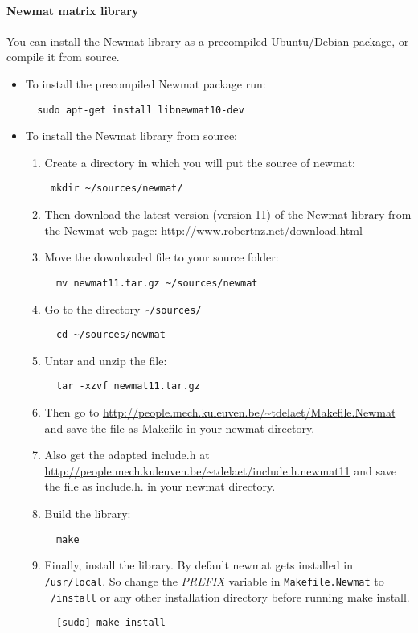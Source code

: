 \documentclass[a4paper,10pt]{article}
\begin{document}
\paragraph{Newmat matrix library}
You can install the Newmat library as a precompiled Ubuntu/Debian
package, or compile it from source.
\begin{itemize}
\item To install the precompiled Newmat package run:
\begin{verbatim}
  sudo apt-get install libnewmat10-dev
\end{verbatim}


\item To install the Newmat library from source:
\begin{enumerate}
\item Create a directory in which you will put the source of newmat:
\begin{verbatim}
 mkdir ~/sources/newmat/
\end{verbatim}
\item Then download the latest version (version 11) of the Newmat library from the
  Newmat web page:
  \url{http://www.robertnz.net/download.html}
\item Move the downloaded file to your source folder:
\begin{verbatim}
  mv newmat11.tar.gz ~/sources/newmat
\end{verbatim}
\item Go to the directory \ $\mathtt{\tilde{ }}$\texttt{/sources/}
\begin{verbatim}
  cd ~/sources/newmat
\end{verbatim}
\item Untar and unzip the file:
\begin{verbatim}
  tar -xzvf newmat11.tar.gz
\end{verbatim}
\item Then go to \url{http://people.mech.kuleuven.be/~tdelaet/Makefile.Newmat} and save the file as Makefile in your newmat directory.
\item Also get the adapted include.h at \url{http://people.mech.kuleuven.be/~tdelaet/include.h.newmat11} and save the file as include.h. in your newmat directory.
\item Build the library:
\begin{verbatim}
  make 
\end{verbatim}
\item Finally, install the library.  By default newmat gets installed
  in \texttt{/usr/local}.  So change the \emph{PREFIX} variable in \texttt{Makefile.Newmat} to \texttt{~/install} or any other installation directory before running make install.
\begin{verbatim}
  [sudo] make install
\end{verbatim}
\end{enumerate}
\end{itemize}
\end{document}
